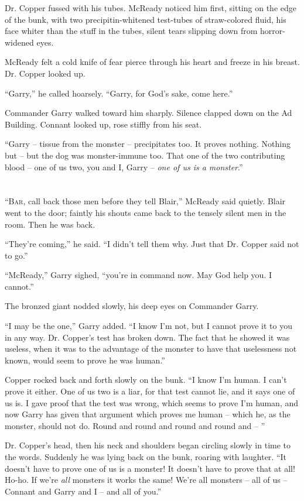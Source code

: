 \documentclass[ebook,oneside,11pt]{memoir}				%
\begin{document}
Dr. Copper fussed with his tubes. McReady noticed him first, sitting on the edge of the bunk, with two precipitin-whitened test-tubes of straw-colored fluid, his face whiter than the stuff in the tubes, silent tears slipping down from horror-widened eyes.

McReady felt a cold knife of fear pierce through his heart and freeze in his breast. Dr. Copper looked up.

``Garry,'' he called hoarsely. ``Garry, for God's sake, come here.''

Commander Garry walked toward him sharply. Silence clapped down on the Ad Building. Connant looked up, rose stiffly from his seat.

``Garry -- tissue from the monster -- precipitates too. It proves nothing. Nothing but -- but the dog was monster-immune too. That one of the two contributing blood -- one of us two, you and I, Garry -- \emph{one of us is a monster}.'' 

\chapter[Chapter 9]{}
\lettrine[lines=3,findent=2pt,nindent=2pt]{``B}{ar}, call back those men before they tell Blair,'' McReady said quietly. Blair went to the door; faintly his shouts came back to the tensely silent men in the room. Then he was back.

``They're coming,'' he said. ``I didn't tell them why. Just that Dr. Copper said not to go.''

``McReady,'' Garry sighed, ``you're in command now. May God help you. I cannot.''

The bronzed giant nodded slowly, his deep eyes on Commander Garry.

``I may be the one,'' Garry added. ``I know I'm not, but I cannot prove it to you in any way. Dr. Copper's test has broken down. The fact that he showed it was useless, when it was to the advantage of the monster to have that uselessness not known, would seem to prove he was human.''

Copper rocked back and forth slowly on the bunk. ``I know I'm human. I can't prove it either. One of us two is a liar, for that test cannot lie, and it says one of us is. I gave proof that the test was wrong, which seems to prove I'm human, and now Garry has given that argument which proves me human -- which he, as the monster, should not do. Round and round and round and round and -- ''

Dr. Copper's head, then his neck and shoulders began circling slowly in time to the words. Suddenly he was lying back on the bunk, roaring with laughter. ``It doesn't have to prove one of us is a monster! It doesn't have to prove that at all! Ho-ho. If we're \emph{all} monsters it works the same! We're all monsters -- all of us -- Connant and Garry and I -- and all of you.''
\end{document}

